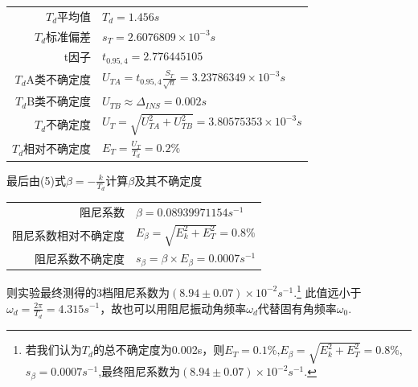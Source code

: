 \documentclass[UTF8]{ctexart}
\begin{document}
\begin{center}\begin{tabular}{r l}
{$T_{d}$平均值}& {$T_{d}=1.456s$}\\
{$T_{d}$标准偏差}& {$s_T=2.6076809\times 10^{-3}s$}\\
{t因子}& {$t_{0.95,4}=2.776445105$}\\
{$T_{d}$A类不确定度}& {$U_{TA}=t_{0.95,4}\frac{S_T}{\sqrt{n}}=3.23786349\times 10^{-3}s$}\\
{$T_{d}$B类不确定度}& {$U_{TB}\approx \Delta_{INS}=0.002s$}\\
{$T_{d}$不确定度}&{$U_T=\sqrt{U_{TA}^2+U_{TB}^2}=3.80575353\times 10^{-3}s$}\\
{$T_{d}$相对不确定度}&{$E_T=\frac{U_T}{T_{d}}=0.2\%$}
\end{tabular}\end{center}
最后由(5)式$\beta=-\frac{k}{T_{d}}$计算$\beta$及其不确定度
\begin{center}\begin{tabular}{r l}
{阻尼系数}& {$\beta=0.08939971154s^{-1}$}\\
{阻尼系数相对不确定度}&{$E_{\beta}=\sqrt{E_k^2+E_T^2}=0.8\%$}\\
{阻尼系数不确定度}&{$s_{\beta}=\beta\times E_{\beta}=0.0007s^{-1}$}
\end{tabular}\end{center}
则实验最终测得的3档阻尼系数为$(8.94\pm0.07)\times10^{-2}s^{-1}$.\footnote{ 若我们认为$T_d$的总不确定度为0.002s，则$E_T=0.1\%$,$E_{\beta}=\sqrt{E_k^2+E_T^2}=0.8\%$,$s_{\beta}=0.0007s^{-1}$,最终阻尼系数为$(8.94\pm0.07)\times10^{-2}s^{-1}$.}
此值远小于$\omega_d=\frac{2\pi}{T_d}=4.315s^{-1}$，故也可以用阻尼振动角频率$\omega_d$代替固有角频率$\omega_0$.
\end{document}
